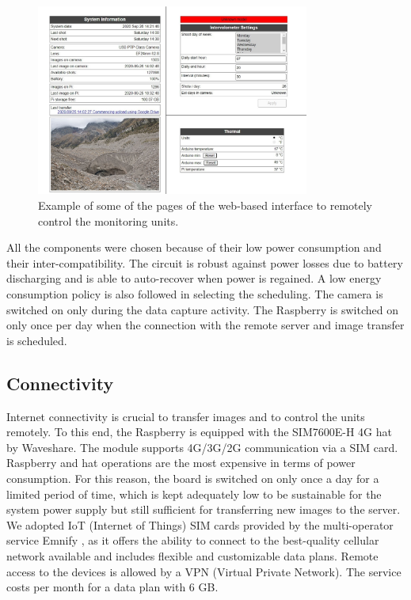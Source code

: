 \begin{figure}[h!]
  \centering
  \includegraphics[width=0.8\textwidth]{web_interface.png}
  \caption{Example of some of the pages of the web-based interface to remotely control
    the monitoring units.}
  \label{fig:4:web-interface}
\end{figure}

All the components were chosen because of their low power consumption and their
inter-compatibility. The circuit is robust against power losses due to battery
discharging and is able to auto-recover when power is regained. A low energy consumption
policy is also followed in selecting the scheduling. The camera is switched on only
during the data capture activity. The Raspberry is switched on only once per day when the
connection with the remote server and image transfer is scheduled.

\subsection{Connectivity}\label{Connectivity}
Internet connectivity is crucial to transfer images and to control the units remotely. To
this end, the Raspberry is equipped with the SIM7600E-H 4G hat by Waveshare. The module
supports 4G/3G/2G communication via a SIM card. Raspberry and hat operations are the most
expensive in terms of power consumption. For this reason, the board is switched on only
once a day for a limited period of time, which is kept adequately low to be sustainable
for the system power supply but still sufficient for transferring new images to the
server. We adopted IoT (Internet of Things) SIM cards provided by the multi-operator
service Emnify \citep{emnify}, as it offers the ability to connect to the best-quality
cellular network available and includes flexible and customizable data plans.
Remote access to the devices is allowed by a VPN (Virtual Private Network).
The service costs  per month for a data plan with 6 GB.

